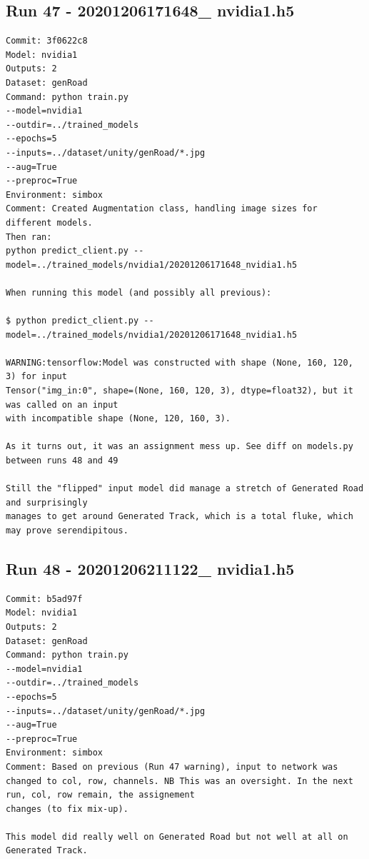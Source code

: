\subsection{Run 47 - 20201206171648\_ nvidia1.h5}
\begin{verbatim}
Commit: 3f0622c8
Model: nvidia1
Outputs: 2
Dataset: genRoad
Command: python train.py
--model=nvidia1
--outdir=../trained_models
--epochs=5
--inputs=../dataset/unity/genRoad/*.jpg
--aug=True
--preproc=True
Environment: simbox
Comment: Created Augmentation class, handling image sizes for different models.
Then ran:
python predict_client.py --model=../trained_models/nvidia1/20201206171648_nvidia1.h5

When running this model (and possibly all previous):

$ python predict_client.py --model=../trained_models/nvidia1/20201206171648_nvidia1.h5

WARNING:tensorflow:Model was constructed with shape (None, 160, 120, 3) for input
Tensor("img_in:0", shape=(None, 160, 120, 3), dtype=float32), but it was called on an input
with incompatible shape (None, 120, 160, 3).

As it turns out, it was an assignment mess up. See diff on models.py between runs 48 and 49

Still the "flipped" input model did manage a stretch of Generated Road and surprisingly
manages to get around Generated Track, which is a total fluke, which may prove serendipitous.
\end{verbatim}


\subsection{Run 48 - 20201206211122\_ nvidia1.h5}
\begin{verbatim}
Commit: b5ad97f
Model: nvidia1
Outputs: 2
Dataset: genRoad
Command: python train.py
--model=nvidia1
--outdir=../trained_models
--epochs=5
--inputs=../dataset/unity/genRoad/*.jpg
--aug=True
--preproc=True
Environment: simbox
Comment: Based on previous (Run 47 warning), input to network was changed to col, row, channels. NB This was an oversight. In the next run, col, row remain, the assignement
changes (to fix mix-up).

This model did really well on Generated Road but not well at all on Generated Track.
\end{verbatim}

